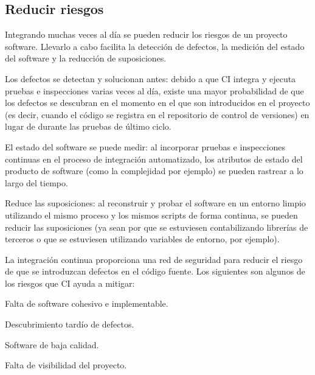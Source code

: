 \subsection{Reducir riesgos}
Integrando muchas veces al día se pueden reducir los riesgos de un proyecto software. Llevarlo a cabo facilita la detección de defectos, la medición del estado del software y la reducción de suposiciones.
\begin{compactitem}
    \item Los defectos se detectan y solucionan antes: debido a que CI integra y ejecuta pruebas e inspecciones varias veces al día, existe una mayor probabilidad de que los defectos se descubran en el momento en el que son introducidos en el proyecto (es decir, cuando el código se registra en el repositorio de control de versiones) en lugar de durante las pruebas de último ciclo.
    \item El estado del software se puede medir: al incorporar pruebas e inspecciones continuas en el proceso de integración automatizado, los atributos de estado del producto de software (como la complejidad por ejemplo) se pueden rastrear a lo largo del tiempo.
    \item Reduce las suposiciones: al reconstruir y probar el software en un entorno limpio utilizando el mismo proceso y los mismos scripts de forma continua, se pueden reducir las suposiciones (ya sean por que se estuviesen contabilizando librerías de terceros o que se estuviesen utilizando variables de entorno, por ejemplo).
\end{compactitem}
La integración continua proporciona una red de seguridad para reducir el riesgo de que se introduzcan defectos en el código fuente. Los siguientes son algunos de los riesgos que CI ayuda a mitigar:
\begin{compactitem}
    \item Falta de software cohesivo e implementable.
    \item Descubrimiento tardío de defectos.
    \item Software de baja calidad.
    \item Falta de visibilidad del proyecto.
\end{compactitem}
